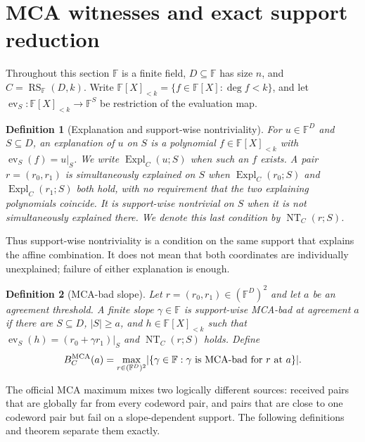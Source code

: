 \documentclass[11pt,a4paper]{amsart}
\numberwithin{equation}{section}
\newtheorem{definition}[definition]{Definition}
\theoremstyle{remark}
\DeclareMathOperator{\RS}{RS}
\newcommand{\F}{\mathbb F}
\newcommand{\abs}[1]{\lvert #1\rvert}
\begin{document}
\section{MCA witnesses and exact support reduction}\label{sec:witnesses}

Throughout this section \(\F\) is a finite field, \(D\subseteq\F\) has
size \(n\), and \(C=\RS_\F(D,k)\).  Write
\(\F[X]_{<k}=\{f\in\F[X]:\deg f<k\}\), and let
\(\operatorname{ev}_S:\F[X]_{<k}\to\F^S\) be restriction of the
evaluation map.

\begin{definition}[Explanation and support-wise nontriviality]
\label{def:explanation}
For \(u\in\F^D\) and \(S\subseteq D\), an \emph{explanation of \(u\) on
\(S\)} is a polynomial \(f\in\F[X]_{<k}\) with
\(\operatorname{ev}_S(f)=u|_S\).  We write
\(\operatorname{Expl}_C(u;S)\) when such an \(f\) exists.  A pair
\(r=(r_0,r_1)\) is \emph{simultaneously explained on \(S\)} when
\(\operatorname{Expl}_C(r_0;S)\) and
\(\operatorname{Expl}_C(r_1;S)\) both hold, with no requirement that the
two explaining polynomials coincide.  It is \emph{support-wise
nontrivial on \(S\)} when it is not simultaneously explained there.
We denote this last condition by \(\operatorname{NT}_C(r;S)\).
\end{definition}

Thus support-wise nontriviality is a condition on the same support that
explains the affine combination.  It does not mean that both coordinates
are individually unexplained; failure of either explanation is enough.

\begin{definition}[MCA-bad slope]\label{def:mca-bad}
Let \(r=(r_0,r_1)\in(\F^D)^2\) and let \(a\) be an agreement threshold.
A finite slope \(\gamma\in\F\) is support-wise MCA-bad at agreement \(a\)
if there are \(S\subseteq D\), \(\abs S\ge a\), and
\(h\in\F[X]_{<k}\) such that
\(\operatorname{ev}_S(h)=(r_0+\gamma r_1)|_S\) and
\(\operatorname{NT}_C(r;S)\) holds.  Define
\[
        B_C^{\rm MCA}(a)
        =\max_{r\in(\F^D)^2}\abs{\{\gamma\in\F:
          \gamma\text{ is MCA-bad for }r\text{ at }a\}}.
\]
\end{definition}

The official MCA maximum mixes two logically different sources: received
pairs that are globally far from every codeword pair, and pairs that are
close to one codeword pair but fail on a slope-dependent support.  The
following definitions and theorem separate them exactly.
\end{document}
